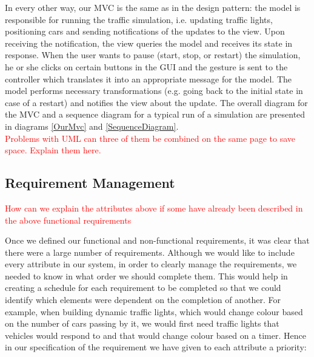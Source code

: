 \documentclass{article}
\begin{document}
	In every other way, our MVC is the same as in the design pattern: the model is responsible for running the traffic simulation, i.e. updating traffic lights, positioning cars and sending notifications of the updates to the view. Upon receiving the notification, the view queries the model and receives its state in response. 
	When the user wants to pause (start, stop, or restart) the simulation, he or she clicks on certain buttons in the GUI and the gesture is sent to the controller which translates it into an appropriate message for the model. 
	The model performs necessary transformations (e.g. going back to the initial state in case of a restart) and notifies the view about the update. 
	The overall diagram for the MVC and a sequence diagram for a typical run of a simulation are presented in diagrams \ref{OurMvc} and \ref{SequenceDiagram}. \\
	
	\textcolor{red}{Problems with UML can three of them be combined on the same page to save space. Explain them here.}
    
	
	\subsection{Requirement Management}\label{Requirement Management}
	\textcolor{red}{How can we explain the attributes above if some have already been described in the above functional requirements\\
	}
	
	Once we defined our functional and non-functional requirements, it was clear that there were a large number of requirements. 
	Although we would like to include every attribute in our system, in order to clearly manage the requirements, we needed to know in what order we should complete them. 
	This would help in creating a schedule for each requirement to be completed so that we could identify which elements were dependent on the completion of another. 
	For example, when building dynamic traffic lights, which would change colour based on the number of cars passing by it, we would first need traffic lights that vehicles would respond to and that would change colour based on a timer. 
	Hence in our specification of the requirement we have given to each attribute a priority:\\
	
\end{document}
